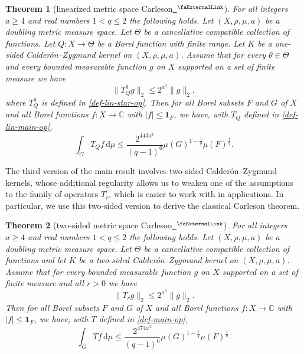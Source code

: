 \documentclass[12pt, reqno]{amsart}
\newcommand*{\complex}{\mathbb{C}} %
\newcommand{\extlink}{~\ensuremath{{}^\text{\faExternalLink}}}
\theoremstyle{definition}
\theoremstyle{plain}
\newtheorem{theorem}{Theorem}[subsection]
\newcommand{\tQ}{{Q}}
\newcommand{\mfa}{{\theta}}
\newcommand{\Mf}{{\Theta}}
\begin{document}
\begin{theorem}[linearized metric space Carleson\href{https://github.com/fpvandoorn/carleson/blob/AFM-frozen/Carleson/MetricCarleson/Linearized.lean\#L109-L115}{\extlink}]
\label{linearized-metric-Carleson}
    For all integers $a \ge 4$ and real numbers $1<q\le 2$ the following holds.
    Let $(X,\rho,\mu,a)$ be a doubling metric measure space. Let $\Mf$ be a
    cancellative compatible collection of functions.
    Let $\tQ:X\to \Mf$ be a Borel function with finite range.
    Let $K$ be a one-sided Calderón--Zygmund kernel on $(X,\rho,\mu,a)$. Assume that for every $\mfa\in \Mf$ and every bounded measurable function $g$ on $X$ supported on a set of finite measure we have
    \begin{equation}\label{linnontanbound}
        \|T_{\tQ}^\mfa g\|_{2} \leq 2^{a^3} \|g\|_2,
    \end{equation}
    where $T_{\tQ}^\mfa$ is defined in \eqref{def-lin-star-op}.
    Then for all Borel subsets $F$ and $G$ of $X$ and all Borel functions $f\colon X\to \complex$ with
    $|f|\le \mathbf{1}_F$, we have, with $T_\tQ$ defined in \eqref{def-lin-main-op},
    \begin{equation*}
        \int_{G} T_\tQ f \, \mathrm{d}\mu \le \frac{2^{443a^3}}{(q-1)^6} \mu(G)^{1-\frac{1}{q}} \mu(F)^{\frac{1}{q}}.
    \end{equation*}
\end{theorem}

The third version of the main result involves two-sided Calderón--Zygmund kernels, whose additional regularity allows us to weaken one of the assumptions to the family of operators $T_r$, which is easier to work with in applications.
In particular, we use this two-sided version to derive the classical Carleson theorem.

\begin{theorem}[two-sided metric space Carleson\href{https://github.com/fpvandoorn/carleson/blob/AFM-frozen/Carleson/TwoSidedCarleson/MainTheorem.lean\#L30-L35}{\extlink}]
    \label{two-sided-metric-space-Carleson}
        For all  integers $a \ge  4$ and real numbers $1<q\le 2$ the following holds.
        Let $(X,\rho,\mu,a)$ be a doubling metric measure space. Let $\Mf$ be a
        cancellative compatible collection of functions and let $K$ be a two-sided Calderón--Zygmund kernel on $(X,\rho,\mu,a)$. Assume that for every bounded measurable function $g$ on $X$ supported on a set of finite measure and all $r>0$ we have
      \begin{equation*}
            \|T_r g\|_{2} \leq 2^{a^3} \|g\|_2.
        \end{equation*}
        Then for all Borel subsets $F$ and $G$ of $X$ and
        all Borel functions $f\colon X\to \complex$ with
        $|f|\le \mathbf{1}_F$, we have, with $T$ defined in \eqref{def-main-op},
      \begin{equation*}
            \int_{G} T f \, \mathrm{d}\mu \leq \frac{2^{474a^3}}{(q-1)^6} \mu(G)^{1-\frac{1}{q}} \mu(F)^{\frac{1}{q}}.
        \end{equation*}
\end{theorem}
\end{document}

